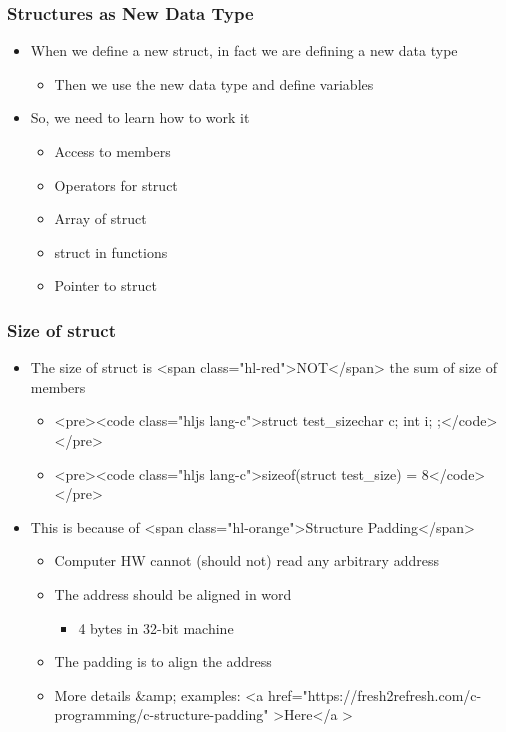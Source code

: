 \documentclass{../c-lecture}
\begin{document}
\begin{frame}
  \frametitle{Structures as New Data Type}
  \begin{itemize}
    \item
      When we define a new struct, in fact we are defining a new data type

    \begin{itemize}
      \item Then we use the new data type and define variables
    \end{itemize}
    \item So, we need to learn how to work it
    \begin{itemize}
      \item Access to members
      \item Operators for struct
      \item Array of struct
      \item struct in functions
      \item Pointer to struct
    \end{itemize}
  \end{itemize}
\end{frame}
\begin{frame}
  \frametitle{Size of struct}
  \begin{itemize}
    \item
      The size of struct is <span class="hl-red">NOT</span> the sum of size of
      members

    \begin{itemize}
      \item
        <pre><code class="hljs lang-c">struct test_size{char c; int i; };</code></pre>

      \item
        <pre><code class="hljs lang-c">sizeof(struct test_size) = 8</code></pre>

    \end{itemize}
    \item This is because of <span class="hl-orange">Structure Padding</span>
    \begin{itemize}
      \item Computer HW cannot (should not) read any arbitrary address
      \item The address should be aligned in word
      \begin{itemize}
        \item 4 bytes in 32-bit machine
      \end{itemize}
      \item The padding is to align the address
      \item
        More details &amp; examples:
        <a href="https://fresh2refresh.com/c-programming/c-structure-padding"
          >Here</a
        >

    \end{itemize}
  \end{itemize}
\end{frame}
\end{document}
